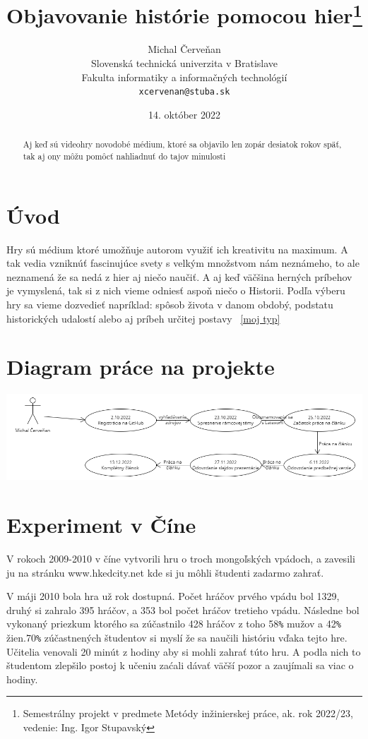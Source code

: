 \documentclass[10pt,twoside,slovak,a4paper]{article}
\title{Objavovanie histórie pomocou hier\thanks{Semestrálny projekt v predmete Metódy inžinierskej práce, ak. rok 2022/23, vedenie: Ing. Igor Stupavský}}
\author{Michal Červeňan\\[2pt]
	{\small Slovenská technická univerzita v Bratislave}\\
	{\small Fakulta informatiky a informačných technológií}\\
	{\small \texttt{xcervenan@stuba.sk}}
	}
\date{\small 14. október 2022}
\begin{document}
\maketitle

\begin{abstract}
Aj keď sú videohry novodobé médium, ktoré sa objavilo len zopár desiatok rokov späť, tak aj ony môžu pomôcť nahliadnuť do tajov minulosti
\end{abstract}



\section{Úvod}

Hry sú médium ktoré umožňuje autorom využiť ich kreativitu na maximum. A tak vedia vzniknúť fascinujúce svety s velkým množstvom nám neznámeho, to ale neznamená že sa nedá z hier aj niečo naučiť. A aj keď väčšina herných príbehov je vymyslená, tak si z nich vieme odniesť aspoň niečo o Historii. Podľa výberu hry sa vieme dozvedieť napríklad: spôsob života v danom obdobý, podstatu historických udalostí alebo aj príbeh určitej postavy ~\ref{moj typ}




\section{Diagram práce na projekte} \label{diagram}
\begin{center}
\includegraphics[width=.6\textwidth]{diagram.png}
\end{center}
\section{Experiment v Číne} \label{cina}
V rokoch 2009-2010 v číne vytvorili hru o troch mongoľských vpádoch, a zavesili ju na stránku www.hkedcity.net kde si ju môhli študenti zadarmo zahrať.

V máji 2010 bola hra už rok dostupná. Počet hráčov prvého vpádu bol 1329\cite{Yan2010}, druhý si zahralo 395 hráčov\cite{Yan2010}, a 353 \cite{Yan2010} bol počet hráčov tretieho vpádu. Následne bol vykonaný priezkum ktorého sa zúčastnilo 428 hráčov z toho 58\verb|%| mužov a 42\verb|%| žien\cite{Yan2010}.70\verb|%| zúčastnených študentov si myslí že sa naučili históriu vďaka tejto hre\cite{Yan2010}. Učitelia venovali 20 minút z hodiny aby si mohli zahrať túto hru\cite{Yan2010}. A podla nich to študentom zlepšilo postoj k učeniu zaćali dávať väčší pozor a zaujímali sa viac o hodiny\cite{Yan2010}.
\end{document}
